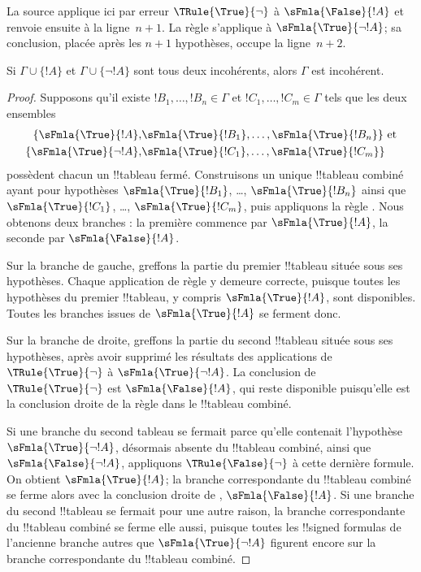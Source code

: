 \documentclass[11pt,a4paper,openany]{memoir}
\begin{document}
\begin{editorial}
La source applique ici par erreur $\TRule{\True}{\lnot}$ à
$\sFmla{\False}{!A}$ et renvoie ensuite à la ligne~$n+1$. La règle
s'applique à $\sFmla{\True}{\lnot !A}$; sa conclusion, placée après
les $n+1$ hypothèses, occupe la ligne~$n+2$.
\end{editorial}

\begin{prop}
  Si $\Gamma \cup \{!A\}$ et $\Gamma \cup \{\lnot !A\}$ sont tous
  deux incohérents, alors $\Gamma$ est incohérent.
\end{prop}

\begin{proof}
  Supposons qu'il existe $!B_1, \dots, !B_n \in \Gamma$ et
  $!C_1, \dots, !C_m \in \Gamma$ tels que les deux ensembles
  \begin{align*}
    \{\sFmla{\True}{!A}, &
    \sFmla{\True}{!B_1}, \dots, \sFmla{\True}{!B_n}\} \text{ et}\\
    \{\sFmla{\True}{\lnot !A}, &
    \sFmla{\True}{!C_1}, \dots, \sFmla{\True}{!C_m}\}
  \end{align*}
  possèdent chacun un !!{tableau} fermé. Construisons un unique
  !!{tableau} combiné ayant pour hypothèses
  $\sFmla{\True}{!B_1}$, \dots, $\sFmla{\True}{!B_n}$ ainsi que
  $\sFmla{\True}{!C_1}$, \dots, $\sFmla{\True}{!C_m}$, puis appliquons
  la règle \Cut{}. Nous obtenons deux branches : la première commence
  par $\sFmla{\True}{!A}$, la seconde par $\sFmla{\False}{!A}$.
  
  Sur la branche de gauche, greffons la partie du premier !!{tableau}
  située sous ses hypothèses. Chaque application de règle y demeure
  correcte, puisque toutes les hypothèses du premier !!{tableau}, y
  compris $\sFmla{\True}{!A}$, sont disponibles. Toutes les branches
  issues de $\sFmla{\True}{!A}$ se ferment donc.
  
  Sur la branche de droite, greffons la partie du second !!{tableau}
  située sous ses hypothèses, après avoir supprimé les résultats des
  applications de~$\TRule{\True}{\lnot}$ à
  $\sFmla{\True}{\lnot !A}$. La conclusion de
  $\TRule{\True}{\lnot}$ est
  $\sFmla{\False}{!A}$, qui reste disponible puisqu'elle est la
  conclusion droite de la règle \Cut{} dans le !!{tableau} combiné.

  Si une branche du second tableau se fermait parce qu'elle contenait
  l'hypothèse $\sFmla{\True}{\lnot !A}$, désormais absente du
  !!{tableau} combiné, ainsi que $\sFmla{\False}{\lnot !A}$, appliquons
  $\TRule{\False}{\lnot}$ à cette dernière formule. On obtient
  $\sFmla{\True}{!A}$; la branche correspondante du !!{tableau}
  combiné se ferme alors avec la conclusion droite de \Cut{},
  $\sFmla{\False}{!A}$. Si une branche du second !!{tableau} se fermait
  pour une autre raison, la branche correspondante du !!{tableau}
  combiné se ferme elle aussi, puisque toutes les !!{signed formula}s
  de l'ancienne branche autres que $\sFmla{\True}{\lnot !A}$ figurent
  encore sur la branche correspondante du !!{tableau} combiné.
  \end{proof}
\end{document}
